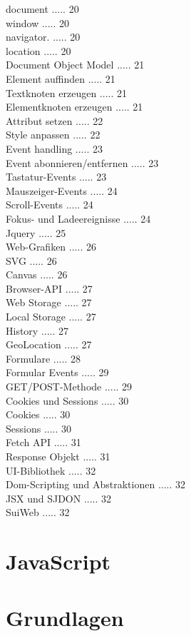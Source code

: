 \documentclass[10pt]{article}
\begin{document}
document ..... 20\\
window ..... 20\\
navigator. ..... 20\\
location ..... 20\\
Document Object Model ..... 21\\
Element auffinden ..... 21\\
Textknoten erzeugen ..... 21\\
Elementknoten erzeugen ..... 21\\
Attribut setzen ..... 22\\
Style anpassen ..... 22\\
Event handling ..... 23\\
Event abonnieren/entfernen ..... 23\\
Tastatur-Events ..... 23\\
Mauszeiger-Events ..... 24\\
Scroll-Events ..... 24\\
Fokus- und Ladeereignisse ..... 24\\
Jquery ..... 25\\
Web-Grafiken ..... 26\\
SVG ..... 26\\
Canvas ..... 26\\
Browser-API ..... 27\\
Web Storage ..... 27\\
Local Storage ..... 27\\
History ..... 27\\
GeoLocation ..... 27\\
Formulare ..... 28\\
Formular Events ..... 29\\
GET/POST-Methode ..... 29\\
Cookies und Sessions ..... 30\\
Cookies ..... 30\\
Sessions ..... 30\\
Fetch API ..... 31\\
Response Objekt ..... 31\\
UI-Bibliothek ..... 32\\
Dom-Scripting und Abstraktionen ..... 32\\
JSX und SJDON ..... 32\\
SuiWeb ..... 32

\section*{JavaScript}
\section*{Grundlagen}
\end{document}
